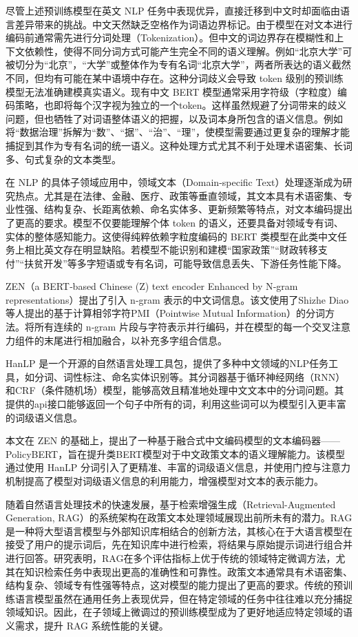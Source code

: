 \documentclass[12pt, a4paper]{ctexart}
\begin{document}
尽管上述预训练模型在英文 NLP 任务中表现优异，直接迁移到中文时却面临由语言差异带来的挑战。中文天然缺乏空格作为词语边界标记。由于模型在对文本进行编码前通常需先进行分词处理（Tokenization）。但中文的词边界存在模糊性和上下文依赖性，使得不同分词方式可能产生完全不同的语义理解。例如“北京大学”可被切分为“北京”，“大学”或整体作为专有名词“北京大学”，两者所表达的语义截然不同，但均有可能在某中语境中存在。这种分词歧义会导致 token 级别的预训练模型无法准确建模真实语义。现有中文 BERT 模型通常采用字符级（字粒度）编码策略，也即将每个汉字视为独立的一个token。这样虽然规避了分词带来的歧义问题，但也牺牲了对词语整体语义的把握，以及词本身所包含的语义信息。例如将“数据治理”拆解为“数”、“据”、“治”、“理”，使模型需要通过更复杂的理解才能捕捉到其作为专有名词的统一语义。这种处理方式尤其不利于处理术语密集、长词多、句式复杂的文本类型。

在 NLP 的具体子领域应用中，领域文本（Domain-specific Text）处理逐渐成为研究热点。尤其是在法律、金融、医疗、政策等垂直领域，其文本具有术语密集、专业性强、结构复杂、长距离依赖、命名实体多、更新频繁等特点，对文本编码提出了更高的要求。模型不仅要能理解个体 token 的语义，还要具备对领域专有词、实体的整体感知能力。这使得纯粹依赖字粒度编码的 BERT 类模型在此类中文任务上相比英文存在明显缺陷。若模型不能识别和建模“国家政策”“财政转移支付”“扶贫开发”等多字短语或专有名词，可能导致信息丢失、下游任务性能下降。

ZEN（a BERT‑based Chinese (Z) text encoder Enhanced by N‑gram representations）提出了引入 n‑gram 表示的中文词信息\cite{diao-etal-2020-zen}。该文使用了Shizhe Diao 等人提出的基于计算相邻字符PMI（Pointwise Mutual Information）的分词方法\cite{DXSJSZ2021}。将所有连续的 n‑gram 片段与字符表示并行编码，并在模型的每一个交叉注意力组件的末尾进行相加融合，以补充多字组合信息。

HanLP 是一个开源的自然语言处理工具包，提供了多种中文领域的NLP任务工具，如分词、词性标注、命名实体识别等\cite{he-choi-2021-stem}。其分词器基于循环神经网络（RNN）和CRF（条件随机场）模型，能够高效且精准地处理中文文本中的分词问题。其提供的api接口能够返回一个句子中所有的词，利用这些词可以为模型引入更丰富的词级语义信息。

本文在 ZEN 的基础上，提出了一种基于融合式中文编码模型的文本编码器——PolicyBERT，旨在提升类BERT模型对于中文政策文本的语义理解能力。该模型通过使用 HanLP 分词引入了更精准、丰富的词级语义信息，并使用门控与注意力机制提高了模型对词级语义信息的利用能力，增强模型对文本的表示能力。

\vspace{2em} %

随着自然语言处理技术的快速发展，基于检索增强生成（Retrieval-Augmented Generation, RAG）的系统架构在政策文本处理领域展现出前所未有的潜力。RAG是一种将大型语言模型与外部知识库相结合的创新方法，其核心在于大语言模型在接受了用户的提示词后，先在知识库中进行检索，将结果与原始提示词进行组合并进行回答。研究表明，RAG在多个评估指标上优于传统的领域特定微调方法，尤其在知识检索任务中表现出更高的准确性和可靠性\cite{lakatos2024investigatingperformanceretrievalaugmentedgeneration}。政策文本通常具有术语密集、结构复杂、领域专有性强等特点，这对模型的能力提出了更高的要求。传统的预训练语言模型虽然在通用任务上表现优异，但在特定领域的任务中往往难以充分捕捉领域知识。因此，在子领域上微调过的预训练模型成为了更好地适应特定领域的语义需求，提升 RAG 系统性能的关键。
\end{document}
